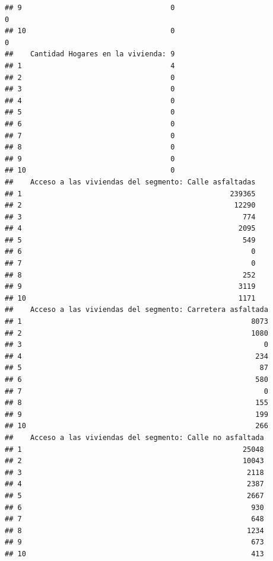\documentclass[11pt,]{article}
\begin{document}
\begin{verbatim}
## 9                                   0                                  0
## 10                                  0                                  0
##    Cantidad Hogares en la vivienda: 9
## 1                                   4
## 2                                   0
## 3                                   0
## 4                                   0
## 5                                   0
## 6                                   0
## 7                                   0
## 8                                   0
## 9                                   0
## 10                                  0
##    Acceso a las viviendas del segmento: Calle asfaltadas
## 1                                                 239365
## 2                                                  12290
## 3                                                    774
## 4                                                   2095
## 5                                                    549
## 6                                                      0
## 7                                                      0
## 8                                                    252
## 9                                                   3119
## 10                                                  1171
##    Acceso a las viviendas del segmento: Carretera asfaltada
## 1                                                      8073
## 2                                                      1080
## 3                                                         0
## 4                                                       234
## 5                                                        87
## 6                                                       580
## 7                                                         0
## 8                                                       155
## 9                                                       199
## 10                                                      266
##    Acceso a las viviendas del segmento: Calle no asfaltada
## 1                                                    25048
## 2                                                    10043
## 3                                                     2118
## 4                                                     2387
## 5                                                     2667
## 6                                                      930
## 7                                                      648
## 8                                                     1234
## 9                                                      673
## 10                                                     413

\end{verbatim}
\end{document}
